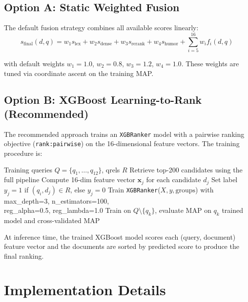 \subsection{Option A: Static Weighted Fusion}

The default fusion strategy combines all available scores linearly:
\begin{equation}
s_{\text{final}}(d,q) = w_1 s_{\text{lex}} + w_2 s_{\text{dense}} + w_3 s_{\text{rerank}} + w_4 s_{\text{humor}} + \sum_{i=5}^{16} w_i f_i(d,q)
\end{equation}

with default weights $w_1 = 1.0$, $w_2 = 0.8$, $w_3 = 1.2$, $w_4 = 1.0$. These weights are tuned via coordinate ascent on the training MAP.

\subsection{Option B: XGBoost Learning-to-Rank (Recommended)}

The recommended approach trains an \texttt{XGBRanker} model \cite{xgboost} with a pairwise ranking objective (\texttt{rank:pairwise}) on the 16-dimensional feature vectors. The training procedure is:

\begin{algorithm}[H]
\caption{XGBoost L2R Training with Leave-One-Query-Out CV}
\begin{algorithmic}[1]
\Require Training queries $Q = \{q_1, \ldots, q_{12}\}$, qrels $R$
    \State Retrieve top-200 candidates using the full pipeline
    \State Compute 16-dim feature vector $\mathbf{x}_j$ for each candidate $d_j$
    \State Set label $y_j = 1$ if $(q_i, d_j) \in R$, else $y_j = 0$
\EndFor
\State Train \texttt{XGBRanker}($X, y, \text{groups}$) with max\_depth=3, n\_estimators=100,\\
\quad reg\_alpha=0.5, reg\_lambda=1.0
 
    \State Train on $Q \setminus \{q_k\}$, evaluate MAP on $q_k$
\EndFor
\State \Return trained model and cross-validated MAP
\end{algorithmic}
\end{algorithm}

At inference time, the trained XGBoost model scores each (query, document) feature vector and the documents are sorted by predicted score to produce the final ranking.

\section{Implementation Details}

